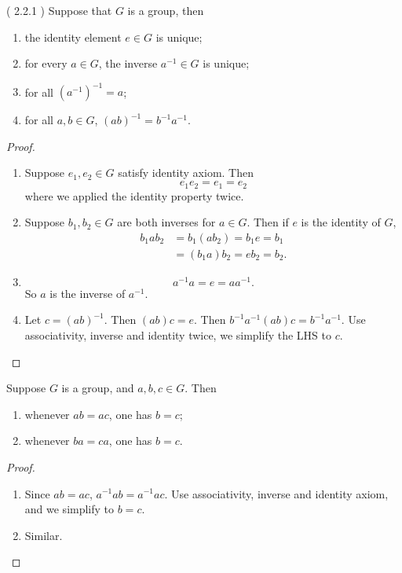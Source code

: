 \begin{lemma}
	( 2.2.1 )
	Suppose that $G$ is a group, then
	\begin{enumerate}
		\item the identity element $e \in G$ is unique;
		\item for every $a \in G$, the inverse $a^{-1} \in G$ is unique;
		\item for all $\left( a^{-1}  \right)^{-1}=a $;
		\item for all $a,b \in G$, $\left( ab  \right) ^{-1} = b^{-1} a^{-1} $.
	\end{enumerate}
\end{lemma}
\begin{proof}
\begin{enumerate}
	\item Suppose $e_1, e_2 \in G$ satisfy identity axiom. Then 
		\[
	e_1e_2 = e_1 = e_2
	\] where we applied the identity property twice. 
\item Suppose $b_1, b_2 \in G$ are both inverses for $a \in G$. Then if $e$ is the identity of $G$,
	\begin{align*}
		b_1ab_2 &= b_1(ab_2) = b_1e=b_1 \\
		&= (b_1a)b_2=eb_2=b_2
		.
	\end{align*}
\item 
	\[
a^{-1} a = e = aa^{-1} 
.\] So $a$ is the inverse of $a^{-1}$.
\item Let $c = \left( ab  \right) ^{-1}$. Then $(ab)c = e$. Then $b^{-1} a^{-1} (ab)c = b^{-1} a^{-1} $. Use associativity, inverse and identity twice, we simplify the LHS to $c$.
\end{enumerate}
\end{proof}

\begin{lemma}
	Suppose  $G$ is a group, and $a,b,c \in G$. Then
	\begin{enumerate}
		\item whenever $ab=ac$, one has $b=c$;
		\item whenever $ba=ca$, one has $b=c$.
	\end{enumerate}
\end{lemma}
\begin{proof}
\begin{enumerate}
	\item Since $ab=ac$, $a^{-1} ab = a^{-1} ac$. Use associativity, inverse and identity axiom, and we simplify to $b=c$.
	\item Similar.
\end{enumerate}
\end{proof}

